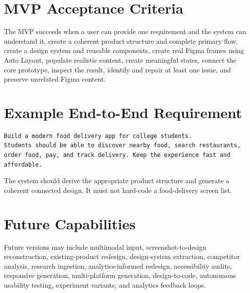 \documentclass[11pt,a4paper]{article}
\begin{document}
\section{MVP Acceptance Criteria}
The MVP succeeds when a user can provide one requirement and the system can understand it, create a coherent product structure and complete primary flow, create a design system and reusable components, create real Figma frames using Auto Layout, populate realistic content, create meaningful states, connect the core prototype, inspect the result, identify and repair at least one issue, and preserve unrelated Figma content.

\section{Example End-to-End Requirement}
\begin{lstlisting}
Build a modern food delivery app for college students.
Students should be able to discover nearby food, search restaurants,
order food, pay, and track delivery. Keep the experience fast and affordable.
\end{lstlisting}
The system should derive the appropriate product structure and generate a coherent connected design. It must not hard-code a food-delivery screen list.

\section{Future Capabilities}
Future versions may include multimodal input, screenshot-to-design reconstruction, existing-product redesign, design-system extraction, competitor analysis, research ingestion, analytics-informed redesign, accessibility audits, responsive generation, multi-platform generation, design-to-code, autonomous usability testing, experiment variants, and analytics feedback loops.

\newpage
\end{document}
